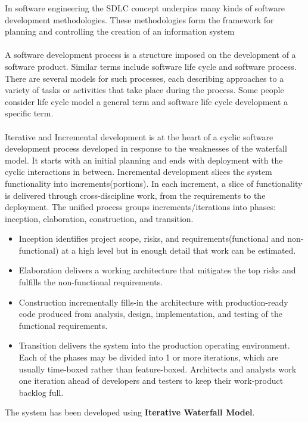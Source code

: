 \documentclass[12pt]{report}
\begin{document}
In software engineering the SDLC concept underpins many kinds of software development 
methodologies. These methodologies form the framework for planning and controlling the 
creation of an information system 
\\
\\
A software development process is a structure imposed on the development of a software 
product. Similar terms include software life cycle and software process. There are several 
models for such processes, each describing approaches to a variety of tasks or activities that 
take place during the process. Some people consider life cycle model a general term and 
software life cycle development a specific term. 
\\
\\
Iterative and Incremental development is at the heart of a cyclic software development 
process developed in response to the weaknesses of the waterfall model. It starts with an 
initial planning and ends with deployment with the cyclic interactions in between. 
Incremental development slices the system functionality into increments(portions). In each 
increment, a slice of functionality is delivered through cross-discipline work, from the 
requirements to the deployment. The unified process groups increments/iterations into 
phases: inception, elaboration, construction, and transition. 

\begin{itemize}
\item Inception identifies project scope, risks, and requirements(functional and non- 
	functional) at a high level but in enough detail that work can be estimated. 
\item  Elaboration delivers a working architecture that mitigates the top risks and 
	fulfills the non-functional requirements. 
\item  Construction incrementally fills-in the architecture with production-ready code 
	produced from analysis, design, implementation, and testing of the functional 
	requirements. 
\item  Transition delivers the system into the production operating environment. 
	Each of the phases may be divided into 1 or more iterations, which are usually time-boxed 
	rather than feature-boxed. Architects and analysts work one iteration ahead of developers 	and testers to keep their work-product backlog full. 
\end{itemize}

The system has been developed using \textbf{Iterative Waterfall Model}. 
\end{document}
